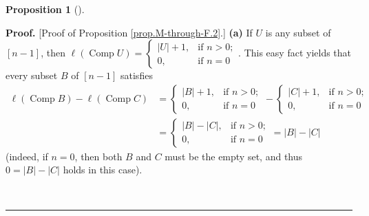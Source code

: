 \documentclass[numbers=enddot,12pt,final,onecolumn,notitlepage]{scrartcl}%
\theoremstyle{definition}
\newtheorem{prop}[theo]{Proposition}
\newenvironment{proposition}[1][]
{\begin{prop}[#1]\begin{leftbar}}
{\end{leftbar}\end{prop}}
\newenvironment{proof}[1][Proof]{\noindent\textbf{#1.} }{\ \rule{0.5em}{0.5em}}
\newenvironment{verlong}{}{}
\begin{document}
\begin{verlong}
\begin{proposition}
\end{proposition}

\begin{proof}
[Proof of Proposition \ref{prop.M-through-F.2}.]
\textbf{(a)} If $U$ is any subset of $\left[  n-1\right]  $, then $\ell\left(
\operatorname*{Comp}U\right)  =%
\begin{cases}
\left\vert U\right\vert +1, & \text{if }n>0;\\
0, & \text{if }n=0
\end{cases}
$. This easy fact yields that every subset $B$ of $\left[  n-1\right]  $
satisfies%
\begin{align}
\ell\left(  \operatorname*{Comp}B\right)  -\ell\left(  \operatorname*{Comp}%
C\right)    & =%
\begin{cases}
\left\vert B\right\vert +1, & \text{if }n>0;\\
0, & \text{if }n=0
\end{cases}
-%
\begin{cases}
\left\vert C\right\vert +1, & \text{if }n>0;\\
0, & \text{if }n=0
\end{cases}
\nonumber\\
& =%
\begin{cases}
\left\vert B\right\vert -\left\vert C\right\vert , & \text{if }n>0;\\
0, & \text{if }n=0
\end{cases}
=\left\vert B\right\vert -\left\vert C\right\vert
\label{pf.prop.M-through-F.2.a.l-l}%
\end{align}
(indeed, if $n=0$, then both $B$ and $C$ must be the empty set, and thus
$0=\left\vert B\right\vert -\left\vert C\right\vert $ holds in this case).


\end{proof}
\end{verlong}
\end{document}

